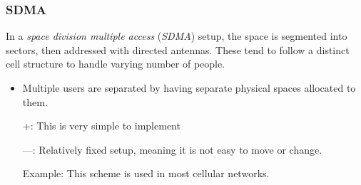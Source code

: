 \subsubsection{SDMA}\label{subsubsec:SDMA}
\begin{definition}\label{def:SDMA}
  In a \emph{space division multiple access} (\emph{SDMA}) setup, the space is segmented into sectors, then addressed with directed antennas.
  These tend to follow a distinct cell structure to handle varying number of people.

  \begin{itemize}[noitemsep]
  \item Multiple users are separated by having separate physical spaces allocated to them.
  \item [+:] This is very simple to implement
  \item [---:] Relatively fixed setup, meaning it is not easy to move or change.
  \item [Example:] This scheme is used in most cellular networks.
\end{itemize}

\end{definition}

